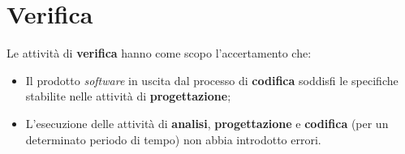 




\section{Verifica}
Le attività di \textbf{verifica} hanno come scopo l'accertamento che:
\begin{itemize}
  \item Il prodotto \textit{software} in uscita dal processo di \textbf{codifica} soddisfi le specifiche stabilite nelle attività di \textbf{progettazione};
  \item L’esecuzione delle attività di \textbf{analisi}, \textbf{progettazione} e \textbf{codifica} (per un determinato periodo di tempo) non abbia introdotto errori.
\end{itemize}

